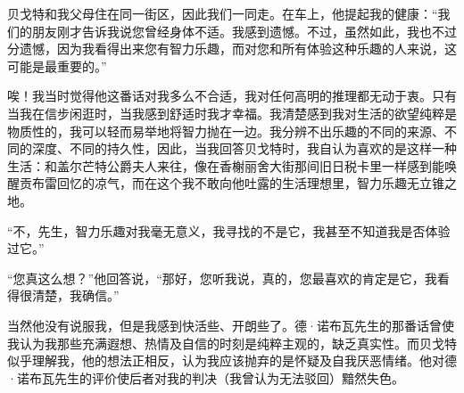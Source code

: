 \par 贝戈特和我父母住在同一街区，因此我们一同走。在车上，他提起我的健康：“我们的朋友刚才告诉我说您曾经身体不适。我感到遗憾。不过，虽然如此，我也不过分遗憾，因为我看得出来您有智力乐趣，而对您和所有体验这种乐趣的人来说，这可能是最重要的。”
\par 唉！我当时觉得他这番话对我多么不合适，我对任何高明的推理都无动于衷。只有当我在信步闲逛时，当我感到舒适时我才幸福。我清楚感到我对生活的欲望纯粹是物质性的，我可以轻而易举地将智力抛在一边。我分辨不出乐趣的不同的来源、不同的深度、不同的持久性，因此，当我回答贝戈特时，我自认为喜欢的是这样一种生活：和盖尔芒特公爵夫人来往，像在香榭丽舍大街那间旧日税卡里一样感到能唤醒贡布雷回忆的凉气，而在这个我不敢向他吐露的生活理想里，智力乐趣无立锥之地。
\par “不，先生，智力乐趣对我毫无意义，我寻找的不是它，我甚至不知道我是否体验过它。”
\par “您真这么想？”他回答说，“那好，您听我说，真的，您最喜欢的肯定是它，我看得很清楚，我确信。”
\par 当然他没有说服我，但是我感到快活些、开朗些了。德·诺布瓦先生的那番话曾使我认为我那些充满遐想、热情及自信的时刻是纯粹主观的，缺乏真实性。而贝戈特似乎理解我，他的想法正相反，认为我应该抛弃的是怀疑及自我厌恶情绪。他对德·诺布瓦先生的评价使后者对我的判决（我曾认为无法驳回）黯然失色。
